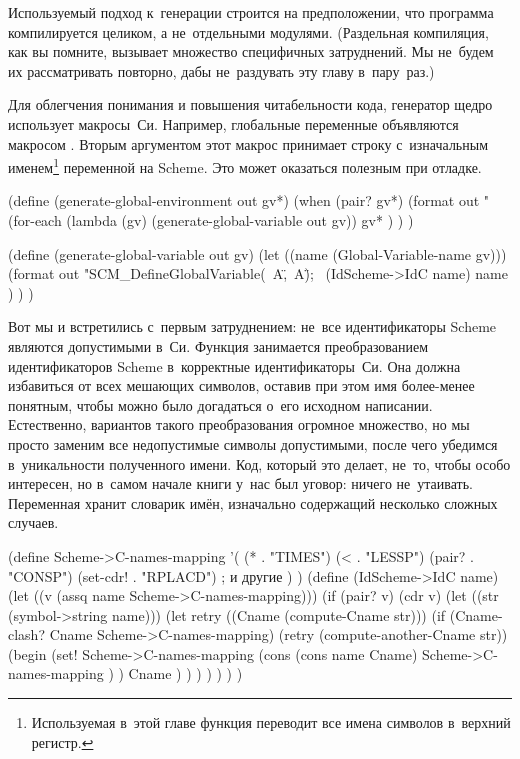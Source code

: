 Используемый подход к~генерации строится на предположении, что программа
компилируется целиком, а не~отдельными модулями. (Раздельная компиляция, как
вы помните, вызывает множество специфичных затруднений.
 Мы не~будем их рассматривать повторно, дабы
не~раздувать эту главу в~пару~раз.)

Для облегчения понимания и повышения читабельности кода, генератор щедро
использует макросы~Си. Например, глобальные переменные объявляются макросом
. Вторым аргументом этот макрос принимает строку
с~изначальным именем\footnote{Используемая в~этой главе функция 
переводит все имена символов в~верхний регистр.} переменной на Scheme. Это может
оказаться полезным при отладке.

\begin{code:lisp}
(define (generate-global-environment out gv*)
  (when (pair? gv*)
    (format out "~%
    (for-each (lambda (gv) (generate-global-variable out gv))
              gv* ) ) )

(define (generate-global-variable out gv)
  (let ((name (Global-Variable-name gv)))
    (format out "SCM_DefineGlobalVariable(~A,\"~A\");~%
            (IdScheme->IdC name) name ) ) )
\end{code:lisp}

Вот мы и встретились с~первым затруднением: не~все идентификаторы Scheme
являются допустимыми в~Си. Функция  занимается преобразованием
идентификаторов Scheme в~корректные идентификаторы~Си. Она должна избавиться от
всех мешающих символов, оставив при этом имя более-менее понятным, чтобы можно
было догадаться о~его исходном написании. Естественно, вариантов такого
преобразования огромное множество, но мы просто заменим все недопустимые символы
допустимыми, после чего убедимся в~уникальности полученного имени. Код, который
это делает, не~то, чтобы особо интересен, но в~самом начале книги у~нас был
уговор: ничего не~утаивать. Переменная  хранит
словарик имён, изначально содержащий несколько сложных случаев.

\begin{code:lisp}
(define Scheme->C-names-mapping
  '( (*        . "TIMES")
     (<        . "LESSP")
     (pair?    . "CONSP")
     (set-cdr! . "RPLACD")
     ; и другие
     ) )
(define (IdScheme->IdC name)
  (let ((v (assq name Scheme->C-names-mapping)))
    (if (pair? v) (cdr v)
        (let ((str (symbol->string name)))
          (let retry ((Cname (compute-Cname str)))
            (if (Cname-clash? Cname Scheme->C-names-mapping)
                (retry (compute-another-Cname str))
                (begin (set! Scheme->C-names-mapping
                             (cons (cons name Cname)
                                   Scheme->C-names-mapping ) )
                       Cname ) ) ) ) ) ) )
\end{code:lisp}

